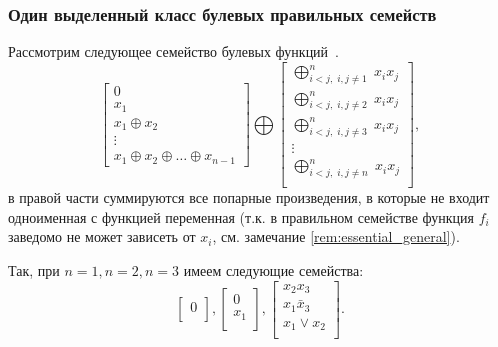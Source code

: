 \subsubsection{Один выделенный класс булевых правильных семейств}
\label{sec:quadfamily}

    Рассмотрим следующее семейство булевых функций~\cite{dm21}.
    \begin{equation}
    \label{example:family1}
        \begin{bmatrix}
            0 \\
            x_1 \\
            x_1 \oplus x_2 \\
            \vdots \\
            x_1 \oplus x_2 \oplus \ldots \oplus x_{n-1}
            \end{bmatrix}
            \bigoplus
            \begin{bmatrix}
            \bigoplus_{i < j, \; i, j \ne 1}^n \; x_i x_j \\
            \bigoplus_{i < j, \; i, j \ne 2}^n \; x_i x_j \\
            \bigoplus_{i < j, \; i, j \ne 3}^n \; x_i x_j \\
            \vdots \\
            \bigoplus_{i < j, \; i, j \ne n}^n \; x_i x_j \\
        \end{bmatrix},
    \end{equation}
    в правой части суммируются все попарные произведения, в которые не входит одноименная с функцией переменная (т.к. в правильном семействе функция $f_i$ заведомо не может зависеть от $x_i$, см. замечание \ref{rem:essential_general}).

    Так, при $n=1, n = 2, n=3$ имеем следующие семейства:
    \[
        \begin{bmatrix}
            0 \\
        \end{bmatrix},
        \begin{bmatrix}
            0 \\
            x_1 \\
        \end{bmatrix},
        \begin{bmatrix}
            x_2 x_3 \\
            x_1 \bar{x}_3 \\
            x_1 \vee x_2 \\
        \end{bmatrix}.
    \]

